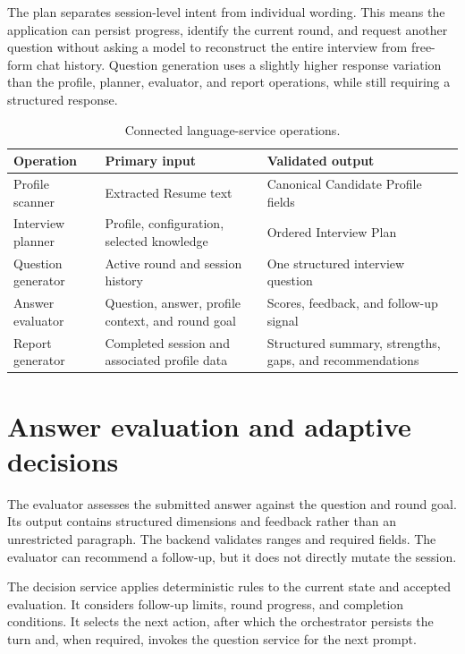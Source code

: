 The plan separates session-level intent from individual wording. This means the application can persist progress, identify the current round, and request another question without asking a model to reconstruct the entire interview from free-form chat history. Question generation uses a slightly higher response variation than the profile, planner, evaluator, and report operations, while still requiring a structured response.

\begin{table}[htbp]\centering
\caption{Connected language-service operations.}\label{tab:model-operations}
\begin{tabularx}{\textwidth}{p{}p{}Y}\toprule
Operation & Primary input & Validated output\\ \midrule
Profile scanner & Extracted Resume text & Canonical Candidate Profile fields\\
Interview planner & Profile, configuration, selected knowledge & Ordered Interview Plan\\
Question generator & Active round and session history & One structured interview question\\
Answer evaluator & Question, answer, profile context, and round goal & Scores, feedback, and follow-up signal\\
Report generator & Completed session and associated profile data & Structured summary, strengths, gaps, and recommendations\\
\bottomrule\end{tabularx}
\end{table}

\section{Answer evaluation and adaptive decisions}

The evaluator assesses the submitted answer against the question and round goal. Its output contains structured dimensions and feedback rather than an unrestricted paragraph. The backend validates ranges and required fields. The evaluator can recommend a follow-up, but it does not directly mutate the session.

The decision service applies deterministic rules to the current state and accepted evaluation. It considers follow-up limits, round progress, and completion conditions. It selects the next action, after which the orchestrator persists the turn and, when required, invokes the question service for the next prompt.

